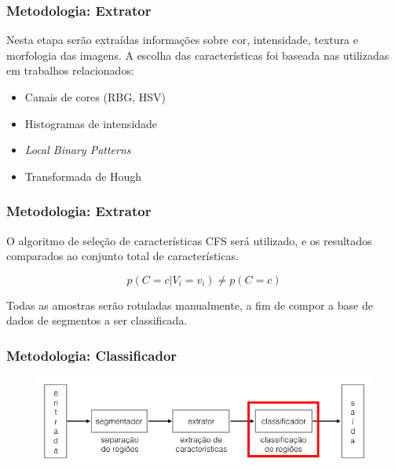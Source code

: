 \documentclass[t]{beamer}
\begin{document}
\begin{frame}[c]

	\frametitle{Metodologia: Extrator}

	Nesta etapa serão extraídas informações sobre cor, intensidade, textura e morfologia das imagens. A escolha das características foi baseada nas utilizadas em trabalhos relacionados: 
	
	\begin{itemize}
		\item Canais de cores (RBG, HSV)
		\item Histogramas de intensidade
		\item \textit{Local Binary Patterns}
		\item Transformada de Hough
	\end{itemize}
\end{frame}

\begin{frame}[c]

	\frametitle{Metodologia: Extrator}

	O algoritmo de seleção de características CFS será utilizado, e os resultados comparados ao conjunto total de características.

	\vspace{0.5cm}

	\begin{equation*}
		\displaystyle p(C=c|V_i=v_i) \neq p(C=c)
	\end{equation*}

	\vspace{0.5cm}

	Todas as amostras serão rotuladas manualmente, a fim de compor a base de dados de segmentos a ser classificada.
\end{frame}

\begin{frame}[c]
	\frametitle{Metodologia: Classificador}
	\begin{figure}[h]
    	\includegraphics[width=\textwidth]{imgs/arquitetura_4}
	\end{figure}
\end{frame}
\end{document}
